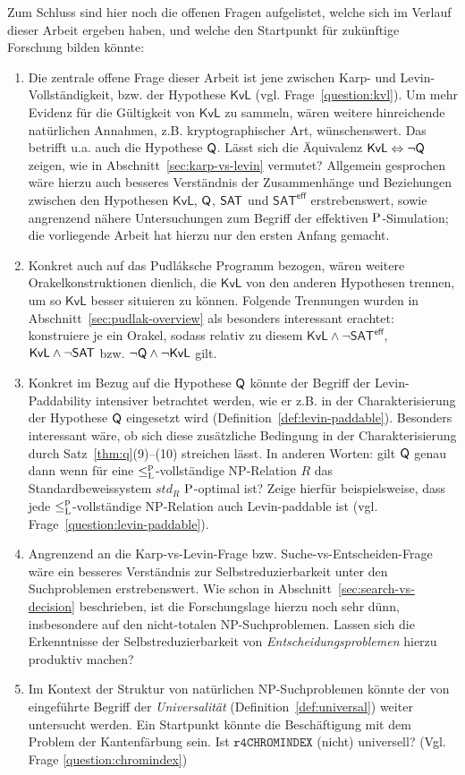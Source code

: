 Zum Schluss sind hier noch die offenen Fragen aufgelistet, welche sich im Verlauf dieser Arbeit ergeben haben, und welche den Startpunkt für zukünftige Forschung bilden könnte:
\begin{enumerate}[label=\arabic*.,midpenalty=0]
    \item Die zentrale offene Frage dieser Arbeit ist jene zwischen Karp- und Levin-Vollständigkeit, bzw. der Hypothese $\mathsf{KvL}$ (vgl. Frage~\ref{question:kvl}). Um mehr Evidenz für die Gültigkeit von $\mathsf{KvL}$ zu sammeln, wären weitere hinreichende natürlichen Annahmen, z.B. kryptographischer Art, wünschenswert.
        Das betrifft u.a. auch die Hypothese $\hQ$. Lässt sich die Äquivalenz $\mathsf{KvL}\Leftrightarrow \neg\hQ$ zeigen, wie in Abschnitt~\ref{sec:karp-vs-levin} vermutet?
        Allgemein gesprochen wäre hierzu auch besseres Verständnis der Zusammenhänge und Beziehungen zwischen den Hypothesen $\mathsf{KvL}$, $\hQ$, $\hSAT$ und $\mathsf{SAT^{eff}}$ erstrebenswert, sowie angrenzend nähere Untersuchungen zum Begriff der effektiven $\P$-Simulation; die vorliegende Arbeit hat hierzu nur den ersten Anfang gemacht.

    \item Konkret auch auf das Pudláksche Programm bezogen, wären weitere Orakelkonstruktionen dienlich, die $\mathsf{KvL}$ von den anderen Hypothesen trennen, um so $\mathsf{KvL}$ besser situieren zu können. Folgende Trennungen wurden in Abschnitt~\ref{sec:pudlak-overview} als besonders interessant erachtet: konstruiere je ein Orakel, sodass relativ zu diesem $\mathsf{KvL}\land\neg\mathsf{SAT^{eff}}$, $\mathsf{KvL}\land\neg\hSAT$ bzw. $\neg\hQ\land\neg\mathsf{KvL}$ gilt.
    \item Konkret im Bezug auf die Hypothese $\hQ$ könnte der Begriff der Levin-Paddability intensiver betrachtet werden, wie er z.B. in der Charakterisierung der Hypothese $\hQ$ eingesetzt wird (Definition~\ref{def:levin-paddable}). Besonders interessant wäre, ob sich diese zusätzliche Bedingung in der Charakterisierung durch Satz~\ref{thm:q}(9)–(10) streichen lässt. In anderen Worten: gilt $\hQ$ genau dann wenn für eine $\leqlp$-vollständige NP-Relation $R$ das Standardbeweissystem $\mathit{std}_R$ $\P$-optimal ist?
        Zeige hierfür beispielsweise, dass jede $\leqlp$-vollständige NP-Relation auch Levin-paddable ist (vgl. Frage~\ref{question:levin-paddable}).
    \item Angrenzend an die Karp-vs-Levin-Frage bzw. Suche-vs-Entscheiden-Frage wäre ein besseres Verständnis zur Selbstreduzierbarkeit unter den Suchproblemen erstrebenswert. Wie schon in Abschnitt~\ref{sec:search-vs-decision} beschrieben, ist die Forschungslage hierzu noch sehr dünn, insbesondere auf den nicht-totalen NP-Suchproblemen. Lassen sich die Erkenntnisse der Selbstreduzierbarkeit von \emph{Entscheidungsproblemen} hierzu produktiv machen?
\item Im Kontext der Struktur von natürlichen NP-Suchproblemen könnte der von \textcite{agrawal_universal_1992} eingeführte Begriff der \emph{Universalität} (Definition~\ref{def:universal}) weiter untersucht werden. Ein Startpunkt könnte die Beschäftigung mit dem Problem der Kantenfärbung sein. Ist $\mathtt{r4CHROMINDEX}$ (nicht) universell? (Vgl. Frage \ref{question:chromindex})
\end{enumerate}
